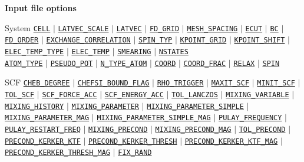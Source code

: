 \begin{frame}[allowframebreaks]{\textbf{Input file options}} \label{Index}
\vspace{-2mm}
\begin{block}{System}
\hyperlink{CELL}{\texttt{CELL}} $\vert$ \hyperlink{LATVEC_SCALE}{\texttt{LATVEC\_SCALE}} $\vert$ \hyperlink{LATVEC}{\texttt{LATVEC}}  $\vert$ \hyperlink{FD_GRID}{\texttt{FD\_GRID}} $\vert$ \hyperlink{MESH_SPACING}{\texttt{MESH\_SPACING}} $\vert$ \hyperlink{ECUT}{\texttt{ECUT}} $\vert$ \hyperlink{BC}{\texttt{BC}} $\vert$ \hyperlink{FD_ORDER}{\texttt{FD\_ORDER}} $\vert$ \hyperlink{EXCHANGE_CORRELATION}{\texttt{EXCHANGE\_CORRELATION}} $\vert$ \hyperlink{SPIN_TYP}{\texttt{SPIN\_TYP}} $\vert$ \hyperlink{KPOINT_GRID}{\texttt{KPOINT\_GRID}} $\vert$ \hyperlink{KPOINT_SHIFT}{\texttt{KPOINT\_SHIFT}} $\vert$ \hyperlink{ELEC_TEMP_TYPE}{\texttt{ELEC\_TEMP\_TYPE}} $\vert$ \hyperlink{ELEC_TEMP}{\texttt{ELEC\_TEMP}} $\vert$ \hyperlink{SMEARING}{\texttt{SMEARING}} $\vert$ \hyperlink{NSTATES}{\texttt{NSTATES}} \\
\hyperlink{ATOM_TYPE}{\texttt{ATOM\_TYPE}} $\vert$ \hyperlink{PSEUDO_POT}{\texttt{PSEUDO\_POT}}  $\vert$ \hyperlink{N_TYPE_ATOM}{\texttt{N\_TYPE\_ATOM}} $\vert$ \hyperlink{COORD}{\texttt{COORD}} $\vert$ \hyperlink{COORD_FRAC}{\texttt{COORD\_FRAC}} $\vert$ \hyperlink{RELAX}{\texttt{RELAX}} $\vert$ \hyperlink{SPIN}{\texttt{SPIN}} 
\end{block}

\begin{block}{SCF}
\hyperlink{CHEB_DEGREE}{\texttt{CHEB\_DEGREE}} $\vert$ \hyperlink{CHEFSI_BOUND_FLAG}{\texttt{CHEFSI\_BOUND\_FLAG}} $\vert$ \hyperlink{RHO_TRIGGER}{\texttt{RHO\_TRIGGER}} $\vert$ \hyperlink{MAXIT_SCF}{\texttt{MAXIT\_SCF}} $\vert$ \hyperlink{MINIT_SCF}{\texttt{MINIT\_SCF}} $\vert$ \hyperlink{TOL_SCF}{\texttt{TOL\_SCF}} $\vert$ \hyperlink{SCF_FORCE_ACC}{\texttt{SCF\_FORCE\_ACC}} $\vert$ \hyperlink{SCF_ENERGY_ACC}{\texttt{SCF\_ENERGY\_ACC}} $\vert$ \hyperlink{TOL_LANCZOS}{\texttt{TOL\_LANCZOS}} $\vert$ \hyperlink{MIXING_VARIABLE}{\texttt{MIXING\_VARIABLE}} $\vert$ \hyperlink{MIXING_HISTORY}{\texttt{MIXING\_HISTORY}} $\vert$ \hyperlink{MIXING_PARAMETER}{\texttt{MIXING\_PARAMETER}} $\vert$ \hyperlink{MIXING_PARAMETER_SIMPLE}{\texttt{MIXING\_PARAMETER\_SIMPLE}} $\vert$ \hyperlink{MIXING_PARAMETER_MAG}{\texttt{MIXING\_PARAMETER\_MAG}} $\vert$ \hyperlink{MIXING_PARAMETER_SIMPLE_MAG}{\texttt{MIXING\_PARAMETER\_SIMPLE\_MAG}} $\vert$ \hyperlink{PULAY_FREQUENCY}{\texttt{PULAY\_FREQUENCY}} $\vert$ \hyperlink{PULAY_RESTART_FREQ}{\texttt{PULAY\_RESTART\_FREQ}} $\vert$ \hyperlink{MIXING_PRECOND}{\texttt{MIXING\_PRECOND}} $\vert$  \hyperlink{MIXING_PRECOND_MAG}{\texttt{MIXING\_PRECOND\_MAG}} $\vert$ \hyperlink{TOL_PRECOND}{\texttt{TOL\_PRECOND}} $\vert$ \hyperlink{PRECOND_KERKER_KTF}{\texttt{PRECOND\_KERKER\_KTF}} $\vert$ \hyperlink{PRECOND_KERKER_THRESH}{\texttt{PRECOND\_KERKER\_THRESH}} $\vert$ \hyperlink{PRECOND_KERKER_KTF_MAG}{\texttt{PRECOND\_KERKER\_KTF\_MAG}} $\vert$ \hyperlink{PRECOND_KERKER_THRESH_MAG}{\texttt{PRECOND\_KERKER\_THRESH\_MAG}} $\vert$ \hyperlink{FIX_RAND}{\texttt{FIX\_RAND}}
\end{block}


\end{frame}
